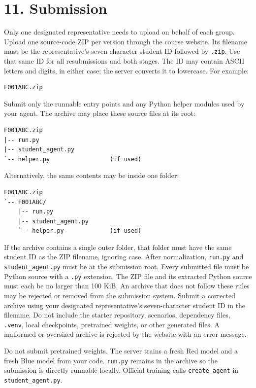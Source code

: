 \documentclass[12pt]{report}
\begin{document}
\section*{11. Submission}

Only one designated representative needs to upload on behalf of each group.
Upload one source-code ZIP per version through the course website. Its filename
must be the representative's seven-character student ID followed by \texttt{.zip}.
Use that same ID for all resubmissions and both stages. The ID may contain ASCII
letters and digits, in either case; the server converts it to lowercase. For
example:

\begin{verbatim}
F001ABC.zip
\end{verbatim}

Submit only the runnable entry points and any Python helper modules used by your
agent. The archive may place these source files at its root:

\begin{verbatim}
F001ABC.zip
|-- run.py
|-- student_agent.py
`-- helper.py                 (if used)
\end{verbatim}

Alternatively, the same contents may be inside one folder:

\begin{verbatim}
F001ABC.zip
`-- F001ABC/
    |-- run.py
    |-- student_agent.py
    `-- helper.py             (if used)
\end{verbatim}

If the archive contains a single outer folder, that folder must have the same
student ID as the ZIP filename, ignoring case. After normalization,
\texttt{run.py} and \texttt{student\_agent.py} must be at the submission root.
Every submitted file must be Python source with a \texttt{.py} extension. The
ZIP file and its extracted Python source must each be no larger than 100 KiB.
An archive that does not follow these rules may be rejected or removed from the
submission system. Submit a corrected archive using your designated
representative's seven-character student ID in the filename.
Do not include the starter repository, scenarios, dependency files,
\texttt{.venv}, local checkpoints, pretrained weights, or other generated
files. A malformed or oversized archive is rejected by the website with an
error message.

Do not submit pretrained weights. The server trains a fresh Red model and a
fresh Blue model from your code. \texttt{run.py} remains in the archive so the
submission is directly runnable locally. Official training calls
\texttt{create\_agent} in \texttt{student\_agent.py}.
\end{document}
